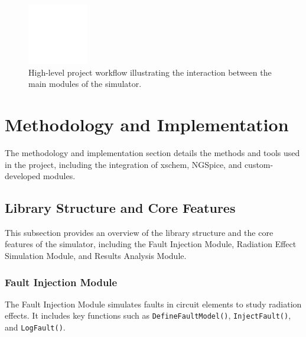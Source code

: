 \documentclass[conference]{IEEEtran}
\begin{document}
\begin{figure}[htbp]
\centering
\includegraphics[width=0.8\linewidth]{project_flow_diagram_placeholder.png}
\caption{High-level project workflow illustrating the interaction between the main modules of the simulator.}
\label{fig:project_flow}
\end{figure}

\section{Methodology and Implementation}
The methodology and implementation section details the methods and tools used in the project, including the integration of xschem, NGSpice, and custom-developed modules.

\subsection{Library Structure and Core Features}
This subsection provides an overview of the library structure and the core features of the simulator, including the Fault Injection Module, Radiation Effect Simulation Module, and Results Analysis Module.

\subsubsection{Fault Injection Module}
The Fault Injection Module simulates faults in circuit elements to study radiation effects. It includes key functions such as \texttt{DefineFaultModel()}, \texttt{InjectFault()}, and \texttt{LogFault()}.
\end{document}
